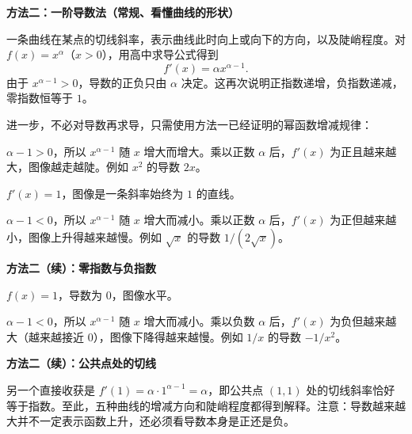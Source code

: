 \begin{proofbox}
\textbf{\textcolor{CProof}{方法二：一阶导数法（常规、看懂曲线的形状）}}



  一条曲线在某点的切线斜率，表示曲线此时向上或向下的方向，以及陡峭程度。对 $f(x)=x^\alpha$（$x>0$），用高中求导公式得到
  \[
     f'(x)=\alpha x^{\alpha-1}.
  \]
  由于 $x^{\alpha-1}>0$，导数的正负只由 $\alpha$ 决定。这再次说明正指数递增，负指数递减，零指数恒等于 $1$。

  进一步，不必对导数再求导，只需使用方法一已经证明的幂函数增减规律：
  \begin{description}[style=nextline,leftmargin=2.8em,labelsep=0.5em,itemsep=0.45em]
    \item[$\alpha>1$：] $\alpha-1>0$，所以 $x^{\alpha-1}$ 随 $x$ 增大而增大。乘以正数 $\alpha$ 后，$f'(x)$ 为正且越来越大，图像越走越陡。例如 $x^2$ 的导数 $2x$。
    \item[$\alpha=1$：] $f'(x)=1$，图像是一条斜率始终为 $1$ 的直线。
    \item[$0<\alpha<1$：] $\alpha-1<0$，所以 $x^{\alpha-1}$ 随 $x$ 增大而减小。乘以正数 $\alpha$ 后，$f'(x)$ 为正但越来越小，图像上升得越来越慢。例如 $\sqrt{x}$ 的导数 $1/(2\sqrt{x})$。
    \end{description}\end{proofbox}\clearpage\begin{proofbox}\textbf{\textcolor{CProof}{方法二（续）：零指数与负指数}}

\begin{description}[style=nextline,leftmargin=2.8em,labelsep=0.5em,itemsep=0.45em]\item[$\alpha=0$：] $f(x)=1$，导数为 $0$，图像水平。
    \item[$\alpha<0$：] $\alpha-1<0$，所以 $x^{\alpha-1}$ 随 $x$ 增大而减小。乘以负数 $\alpha$ 后，$f'(x)$ 为负但越来越大（越来越接近 $0$），图像下降得越来越慢。例如 $1/x$ 的导数 $-1/x^2$。
  \end{description}

\end{proofbox}\clearpage\begin{proofbox}\textbf{\textcolor{CProof}{方法二（续）：公共点处的切线}}

  另一个直接收获是 $f'(1)=\alpha\cdot 1^{\alpha-1}=\alpha$，即公共点 $(1,1)$ 处的切线斜率恰好等于指数。至此，五种曲线的增减方向和陡峭程度都得到解释。注意：导数越来越大并不一定表示函数上升，还必须看导数本身是正还是负。

  \medskip
  
\end{proofbox}
